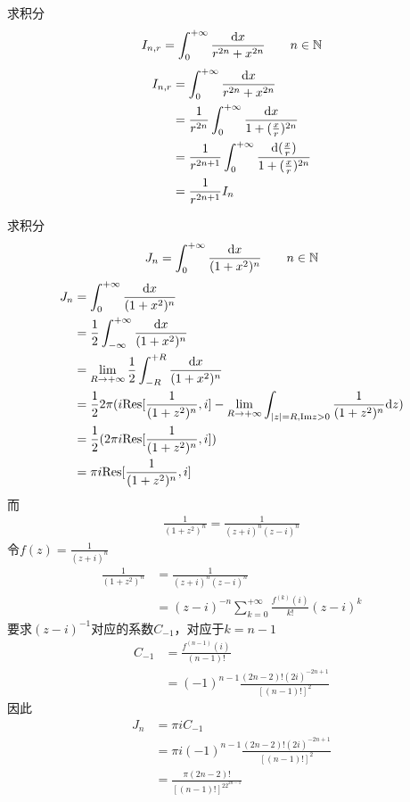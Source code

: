 \begin{homeworkProblem}
    求积分
    \[
    I_{n,r} = \int_0^{+\infty}\frac{\mathrm{d}x}{r^{2n}+x^{2n}}\qquad n\in\mathbb{N}
    \]
\solution
\[\begin{split}
I_{n,r} &= \int_0^{+\infty}\frac{\mathrm{d}x}{r^{2n}+x^{2n}}\\
&= \frac{1}{r^{2n}}\int_0^{+\infty}\frac{\mathrm{d}x}{1+(\frac{x}{r})^{2n}}\\
&= \frac{1}{r^{2n+1}}\int_0^{+\infty}\frac{\mathrm{d}(\frac{x}{r})}{1+(\frac{x}{r})^{2n}}\\
&= \frac{1}{r^{2n+1}}I_n
\end{split}\]
\end{homeworkProblem}
\begin{homeworkProblem}
    求积分
    \[
    J_n = \int_0^{+\infty}\frac{\mathrm{d}x}{(1+x^2)^n} \qquad n\in\mathbb{N}
    \]
\solution
\[\begin{split}
J_n &= \int_0^{+\infty}\frac{\mathrm{d}x}{(1+x^2)^n}\\
&=\frac{1}{2}\int_{-\infty}^{+\infty}\frac{\mathrm{d}x}{(1+x^2)^n}\\
&=\lim_{R\rightarrow+\infty}\frac{1}{2}\int_{-R}^{+R}\frac{\mathrm{d}x}{(1+x^2)^n}\\
&=\frac{1}{2}2\pi (i\mathrm{Res}[\frac{1}{(1+z^2)^n}, i]
- \lim_{R\rightarrow+\infty}\int_{|z|=R, \mathrm{Im}z>0}\frac{1}{(1+z^2)^n}\mathrm{d}z)\\
&=\frac{1}{2}(2\pi i\mathrm{Res}[\frac{1}{(1+z^2)^n}, i])\\
&=\pi i\mathrm{Res}[\frac{1}{(1+z^2)^n}, i]
\end{split} \]
而
\[\begin{split}
\frac{1}{(1+z^2)^n} = \frac{1}{(z+i)^n(z-i)^n}
\end{split}\]
令$f(z)=\frac{1}{(z+i)^n}$
\[\begin{split}
\frac{1}{(1+z^2)^n} &= \frac{1}{(z+i)^n(z-i)^n}\\
&= (z-i)^{-n}\sum_{k=0}^{+\infty}\frac{f^{(k)}(i)}{k!}(z-i)^k
\end{split}\]
要求$(z-i)^{-1}$对应的系数$C_{-1}$，对应于$k=n-1$
\[\begin{split}
C_{-1} &= \frac{f^{(n-1)}(i)}{(n-1)!}\\
&= (-1)^{n-1}\frac{(2n-2)!(2i)^{-2n+1}}{[(n-1)!]^2}
\end{split}\]
因此
\[\begin{split}
J_n &= \pi iC_{-1}\\
&= \pi i(-1)^{n-1}\frac{(2n-2)!(2i)^{-2n+1}}{[(n-1)!]^2}\\
&= \frac{\pi(2n-2)!}{[(n-1)!]^22^{2n-1}}
\end{split}\]
\end{homeworkProblem}
